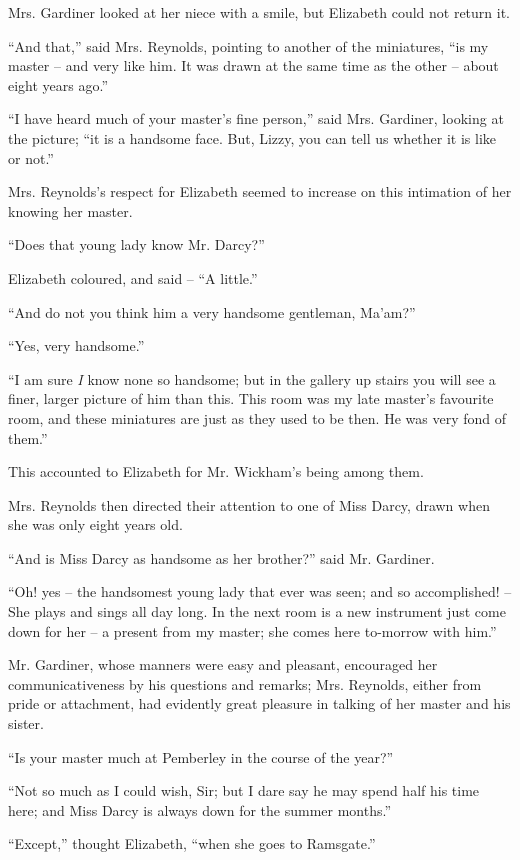 Mrs. Gardiner looked at her niece with a smile, but
Elizabeth could not return it.

“And that,” said Mrs. Reynolds, pointing to another
of the miniatures, “is my master -- and very like him.
It was drawn at the same time as the other -- about eight
years ago.”

“I have heard much of your master’s fine person,”
said Mrs. Gardiner, looking at the picture; “it is a handsome
face. But, Lizzy, you can tell us whether it is like
or not.”

Mrs. Reynolds’s respect for Elizabeth seemed to increase
on this intimation of her knowing her master.

“Does that young lady know Mr. Darcy?”

Elizabeth coloured, and said -- “A little.”

“And do not you think him a very handsome gentleman,
Ma’am?”

“Yes, very handsome.”

“I am sure \textit{I} know none so handsome; but in the
gallery up stairs you will see a finer, larger picture of him
than this. This room was my late master’s favourite
room, and these miniatures are just as they used to be
then. He was very fond of them.”

This accounted to Elizabeth for Mr. Wickham’s being
among them.

Mrs. Reynolds then directed their attention to one of
Miss Darcy, drawn when she was only eight years old.

“And is Miss Darcy as handsome as her bro\-ther?”
said Mr. Gardiner.

“Oh! yes -- the handsomest young lady that ever was
seen; and so accomplished! -- She plays and sings all day
long. In the next room is a new instrument just come
down for her -- a present from my master; she comes here
to-morrow with him.”

Mr. Gardiner, whose manners were easy and pleasant,
encouraged her communicativeness by his questions and
remarks; Mrs. Reynolds, either from pride or attachment,
had evidently great pleasure in talking of her
master and his sister.

“Is your master much at Pemberley in the course of
the year?”

“Not so much as I could wish, Sir; but I dare say he
may spend half his time here; and Miss Darcy is always
down for the summer months.”

“Except,” thought Elizabeth, “when she goes to
Ramsgate.”

